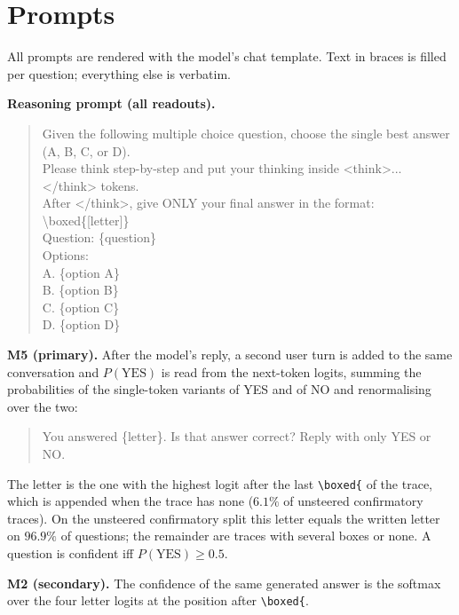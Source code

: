 \section{Prompts}
\label{app:defs}
\label{app:prompts}

All prompts are rendered with the model's chat template. Text in braces is
filled per question; everything else is verbatim.

\textbf{Reasoning prompt (all readouts).}
\begin{quote}\footnotesize\ttfamily
Given the following multiple choice question, choose the single best answer (A, B, C, or D).\\
Please think step-by-step and put your thinking inside <think>...</think> tokens.\\
After </think>, give ONLY your final answer in the format: \textbackslash{}boxed\{[letter]\}\\[3pt]
Question: \{question\}\\
Options:\\
A. \{option A\}\\ B. \{option B\}\\ C. \{option C\}\\ D. \{option D\}
\end{quote}

\textbf{M5 (primary).} After the model's reply, a second user turn is added to
the same conversation and $P(\mathrm{YES})$ is read from the next-token logits,
summing the probabilities of the single-token variants of YES and of NO and
renormalising over the two:
\begin{quote}\footnotesize\ttfamily
You answered \{letter\}. Is that answer correct? Reply with only YES or NO.
\end{quote}
The letter is the one with the highest logit after the last
\texttt{\textbackslash boxed\{} of the trace, which is appended when the trace
has none ($6.1\%$ of unsteered confirmatory traces). On the unsteered
confirmatory split this letter equals the written letter on $96.9\%$ of
questions; the remainder are traces with several boxes or none.
A question is confident iff $P(\mathrm{YES})\ge0.5$.

\textbf{M2 (secondary).} The confidence of the same generated answer is the
softmax over the four letter logits at the position after
\texttt{\textbackslash boxed\{}.

